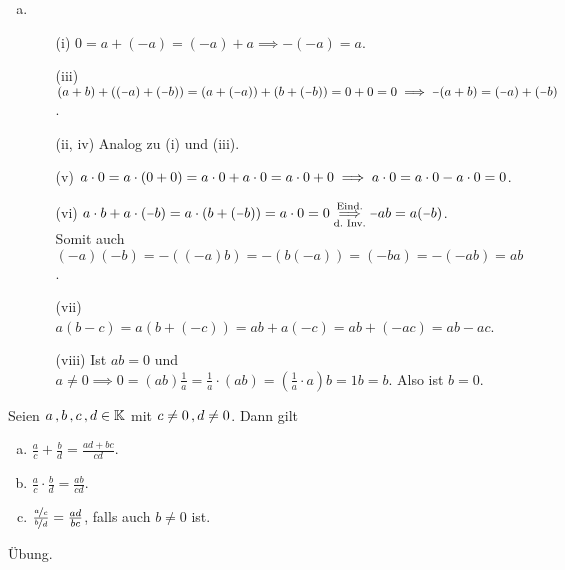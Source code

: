\documentclass[../ana1.tex]{subfiles}
\begin{document}
\begin{bew}\leavevmode
	\begin{enumerate}[(a)]
		\item \begin{enumerate}
				\item[(i)] \(0 = a + (\minus a) = (\minus a) + a \implies \minus(\minus a) = a \).
				\item[(iii)] \((a+b) + ((\minus a)+(\minus b)) = (a + (\minus a)) + (b + (\minus b)) = 0 + 0 = 0 \\
							 \implies \minus(a+b) = (\minus a) + (\minus b) \).
				\item[(ii, iv)] Analog zu (i) und (iii).
				\item[(v)] \(a\cdot 0 = a \cdot (0+0) =a \cdot 0 + a \cdot 0 = a \cdot 0 + 0 \\
						   \implies a \cdot 0 = a \cdot 0 - a \cdot 0 = 0 \).
				\item[(vi)] \(a \cdot b + a \cdot (\minus b) = a \cdot (b + (\minus b)) = a \cdot 0= 0 \\
							\overunderset{\text{Eind.}}{\text{d.\ Inv.}}{\implies} \minus ab = a(\minus b) \). \\
							Somit auch \((\minus a)(\minus b) = \minus((\minus a)b) = \minus(b(\minus a)) = (\minus ba) = \minus(\minus ab) = ab \).
				\item[(vii)] \(a(b - c) = a(b + (\minus c)) = ab + a(\minus c)= ab + (\minus ac)= ab - ac \).
				\item[(viii)] Ist \(ab = 0 \) und \(a \neq 0 \implies 0 = (ab)\frac{1}{a} = \frac{1}{a} \cdot (ab) = (\frac{1}{a} \cdot a)b = 1b = b \).
							  Also ist \(b = 0 \).\qedhere
			  \end{enumerate}
	\end{enumerate}
\end{bew}

\begin{satz}[Bruchrechnen]\label{satz:bruchrechnen}
	Seien \(a \operatorname{,} b \operatorname{,} c \operatorname{,} d \in \mathbb{K} \) mit \(c\neq 0 \operatorname{,} d\neq 0 \). Dann gilt
	\begin{enumerate}[(a)]
		\item \(\frac{a}{c} + \frac{b}{d} = \frac{ad + bc}{cd} \).
		\item \(\frac{a}{c} \cdot \frac{b}{d} = \frac{ab}{cd} \).
		\item \(\frac{\nicefrac{a}{c}}{\nicefrac{b}{d}} = \frac{ad}{bc} \), falls auch \(b\neq 0 \) ist.
	\end{enumerate}
\end{satz}
\begin{bew}
	Übung.\phantom{\qedhere}
\end{bew}
\end{document}
